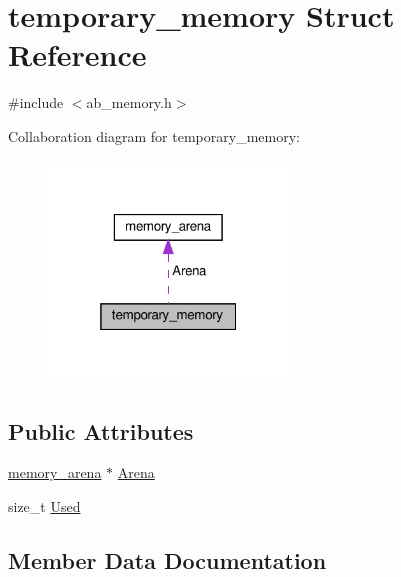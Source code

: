 \hypertarget{structtemporary__memory}{}\section{temporary\+\_\+memory Struct Reference}
\label{structtemporary__memory}


{\ttfamily \#include $<$ab\+\_\+memory.\+h$>$}



Collaboration diagram for temporary\+\_\+memory\+:\nopagebreak
\begin{figure}[H]
\begin{center}
\leavevmode
\includegraphics[width=181pt]{db/d58/structtemporary__memory__coll__graph}
\end{center}
\end{figure}
\subsection*{Public Attributes}
\begin{DoxyCompactItemize}
\item 
\hyperlink{structmemory__arena}{memory\+\_\+arena} $\ast$ \hyperlink{structtemporary__memory_abda353234998fedd47ef739e61bddeea}{Arena}
\item 
size\+\_\+t \hyperlink{structtemporary__memory_af2ea8e067d881e044fbecd269e59a556}{Used}
\end{DoxyCompactItemize}


\subsection{Member Data Documentation}
\mbox{\label{structtemporary__memory_abda353234998fedd47ef739e61bddeea}} 
